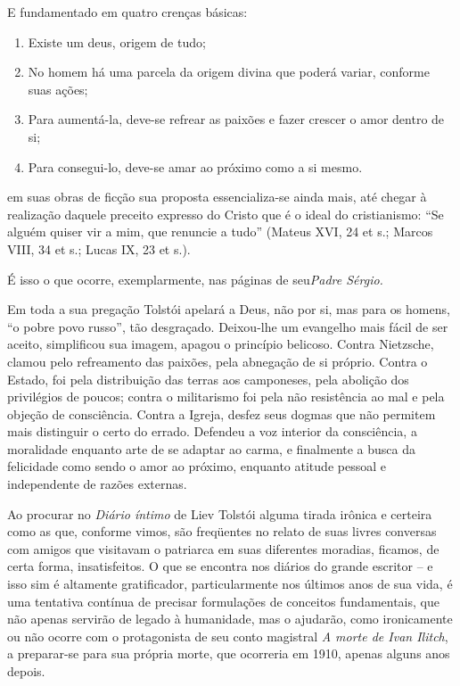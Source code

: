 E fundamentado em quatro crenças básicas:

\begin{enumerate}
\def\labelenumi{\arabic{enumi})}
\item
  Existe um deus, origem de tudo;
\item
  No homem há uma parcela da origem divina que poderá variar, conforme
  suas ações;
\item
  Para aumentá-la, deve-se refrear as paixões e fazer crescer o amor
  dentro de si;
\item
  Para consegui-lo, deve-se amar ao próximo como a si mesmo.
\end{enumerate}

em suas obras de ficção sua proposta essencializa-se ainda mais, até
chegar à realização daquele preceito expresso do Cristo que é o ideal do
cristianismo: ``Se alguém quiser vir a mim, que renuncie a tudo''
(Mateus XVI, 24 et s.; Marcos VIII, 34 et s.; Lucas IX, 23 et s.).

É isso o que ocorre, exemplarmente, nas páginas de seu\emph{Padre
Sérgio.}

Em toda a sua pregação Tolstói apelará a Deus, não por si, mas para os
homens, ``o pobre povo russo'', tão desgraçado. Deixou-lhe um evangelho
mais fácil de ser aceito, simplificou sua imagem, apagou o princípio
belicoso. Contra Nietzsche, clamou pelo refreamento das paixões, pela
abnegação de si próprio. Contra o Estado, foi pela distribuição das
terras aos camponeses, pela abolição dos privilégios de poucos; contra o
militarismo foi pela não resistência ao mal e pela objeção de
consciência. Contra a Igreja, desfez seus dogmas que não permitem mais
distinguir o certo do errado. Defendeu a voz interior da consciência, a
moralidade enquanto arte de se adaptar ao carma, e finalmente a busca da
felicidade como sendo o amor ao próximo, enquanto atitude pessoal e
independente de razões externas.

Ao procurar no \emph{Diário íntimo} de Liev Tolstói alguma tirada
irônica e certeira como as que, conforme vimos, são freqüentes no relato
de suas livres conversas com amigos que visitavam o patriarca em suas
diferentes moradias, ficamos, de certa forma, insatisfeitos. O que se
encontra nos diários do grande escritor -- e isso sim é altamente
gratificador, particularmente nos últimos anos de sua vida, é uma
tentativa contínua de precisar formulações de conceitos fundamentais,
que não apenas servirão de legado à humanidade, mas o ajudarão, como
ironicamente ou não ocorre com o protagonista de seu conto magistral
\emph{A morte de Ivan Ilitch}, a preparar-se para sua própria morte, que
ocorreria em 1910, apenas alguns anos depois.

